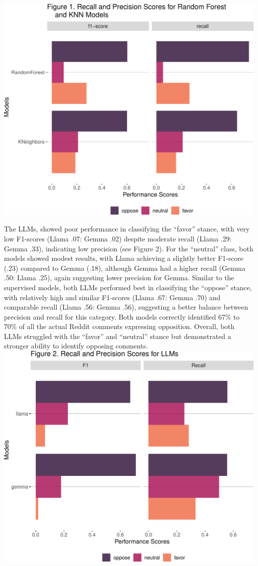 \documentclass[
  12pt]{article}
\begin{document}
\includegraphics{assign_3_files/figure-pdf/unnamed-chunk-3-1.pdf}

The LLMs, showed poor performance in classifying the ``favor'' stance,
with very low F1-scores (Llama .07: Gemma .02) despite moderate recall
(Llama .29: Gemma .33), indicating low precision (see Figure 2). For the
``neutral'' class, both models showed modest results, with Llama
achieving a slightly better F1-score (.23) compared to Gemma (.18),
although Gemma had a higher recall (Gemma .50: Llama .25), again
suggesting lower precision for Gemma. Similar to the supervised models,
both LLMs performed best in classifying the ``oppose'' stance, with
relatively high and similar F1-scores (Llama .67: Gemma .70) and
comparable recall (Llama .56: Gemma .56), suggesting a better balance
between precision and recall for this category. Both models correctly
identified 67\% to 70\% of all the actual Reddit comments expressing
opposition. Overall, both LLMs struggled with the ``favor'' and
``neutral'' stance but demonstrated a stronger ability to identify
opposing comments.\\

\includegraphics{assign_3_files/figure-pdf/unnamed-chunk-5-1.pdf}
\end{document}
